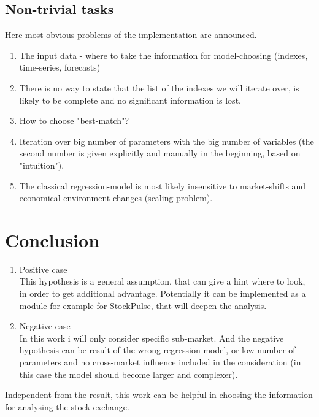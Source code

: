 \documentclass{article}
\begin{document}
\subsection{Non-trivial tasks}
Here most obvious problems of the implementation are announced.
\begin{enumerate}
	 \item The input data - where to take the information for model-choosing (indexes, time-series, forecasts)
	 \item There is no way to state that the list of the indexes we will iterate over, is likely to be complete and no significant information is lost.
	 \item How to choose "best-match"?
	 \item Iteration over big number of parameters with the big number of variables (the second number is given explicitly and manually in the beginning, based on "intuition").
	 \item The classical regression-model is most likely insensitive to market-shifts and economical environment changes (scaling problem).
\end{enumerate}

\newpage
\section {Conclusion}
\begin{enumerate}
	\item Positive case\\
This hypothesis is a general assumption, that can give a hint where to look, in order to get additional advantage. Potentially it can be implemented as a module for example for StockPulse, that will deepen the analysis.
	\item Negative case\\
In this work i will only consider specific sub-market. And the negative hypothesis can be result of the wrong regression-model, or low number of parameters and no cross-market influence included in the consideration (in this case the model should become larger and complexer).
\end{enumerate}
Independent from the result, this work can be helpful in choosing the information for analysing the stock exchange.
\end{document}
